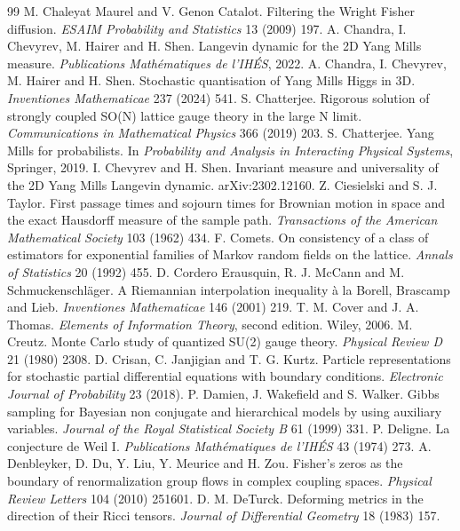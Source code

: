 \begin{thebibliography}{99}
 M. Chaleyat Maurel and V. Genon Catalot. Filtering the Wright Fisher diffusion. \emph{ESAIM Probability and Statistics} 13 (2009) 197.
 A. Chandra, I. Chevyrev, M. Hairer and H. Shen. Langevin dynamic for the 2D Yang Mills measure. \emph{Publications Math\'ematiques de l'IH\'ES}, 2022.
 A. Chandra, I. Chevyrev, M. Hairer and H. Shen. Stochastic quantisation of Yang Mills Higgs in 3D. \emph{Inventiones Mathematicae} 237 (2024) 541.
 S. Chatterjee. Rigorous solution of strongly coupled SO(N) lattice gauge theory in the large N limit. \emph{Communications in Mathematical Physics} 366 (2019) 203.
 S. Chatterjee. Yang Mills for probabilists. In \emph{Probability and Analysis in Interacting Physical Systems}, Springer, 2019.
 I. Chevyrev and H. Shen. Invariant measure and universality of the 2D Yang Mills Langevin dynamic. arXiv:2302.12160.
 Z. Ciesielski and S. J. Taylor. First passage times and sojourn times for Brownian motion in space and the exact Hausdorff measure of the sample path. \emph{Transactions of the American Mathematical Society} 103 (1962) 434.
 F. Comets. On consistency of a class of estimators for exponential families of Markov random fields on the lattice. \emph{Annals of Statistics} 20 (1992) 455.
 D. Cordero Erausquin, R. J. McCann and M. Schmuckenschl\"ager. A Riemannian interpolation inequality \`a la Borell, Brascamp and Lieb. \emph{Inventiones Mathematicae} 146 (2001) 219.
 T. M. Cover and J. A. Thomas. \emph{Elements of Information Theory}, second edition. Wiley, 2006.
 M. Creutz. Monte Carlo study of quantized SU(2) gauge theory. \emph{Physical Review D} 21 (1980) 2308.
 D. Crisan, C. Janjigian and T. G. Kurtz. Particle representations for stochastic partial differential equations with boundary conditions. \emph{Electronic Journal of Probability} 23 (2018).
 P. Damien, J. Wakefield and S. Walker. Gibbs sampling for Bayesian non conjugate and hierarchical models by using auxiliary variables. \emph{Journal of the Royal Statistical Society B} 61 (1999) 331.
 P. Deligne. La conjecture de Weil I. \emph{Publications Math\'ematiques de l'IH\'ES} 43 (1974) 273.
 A. Denbleyker, D. Du, Y. Liu, Y. Meurice and H. Zou. Fisher's zeros as the boundary of renormalization group flows in complex coupling spaces. \emph{Physical Review Letters} 104 (2010) 251601.
 D. M. DeTurck. Deforming metrics in the direction of their Ricci tensors. \emph{Journal of Differential Geometry} 18 (1983) 157.

\end{thebibliography}
